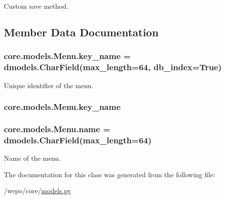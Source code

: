 Custom save method. 



\subsection{Member Data Documentation}
\hypertarget{classcore_1_1models_1_1Menu_a68d1ce76cccad9def97d24afe21ad728}{
\subsubsection[{key\-\_\-name}]{\setlength{\rightskip}{0pt plus 5cm}core.\-models.\-Menu.\-key\-\_\-name = dmodels.\-Char\-Field(max\-\_\-length=64, db\-\_\-index=True)\hspace{0.3cm}{\ttfamily [static]}}}\label{classcore_1_1models_1_1Menu_a68d1ce76cccad9def97d24afe21ad728}


Unique identifier of the menu. 

\hypertarget{classcore_1_1models_1_1Menu_a68d1ce76cccad9def97d24afe21ad728}{
\subsubsection[{key\-\_\-name}]{\setlength{\rightskip}{0pt plus 5cm}core.\-models.\-Menu.\-key\-\_\-name}}\label{classcore_1_1models_1_1Menu_a68d1ce76cccad9def97d24afe21ad728}
\hypertarget{classcore_1_1models_1_1Menu_a6782a44a3141438c0eca3fd2bcff4e9c}{
\subsubsection[{name}]{\setlength{\rightskip}{0pt plus 5cm}core.\-models.\-Menu.\-name = dmodels.\-Char\-Field(max\-\_\-length=64)\hspace{0.3cm}{\ttfamily [static]}}}\label{classcore_1_1models_1_1Menu_a6782a44a3141438c0eca3fd2bcff4e9c}


Name of the menu. 



The documentation for this class was generated from the following file\-:\begin{DoxyCompactItemize}
\item 
/wepo/core/\hyperlink{models_8py}{models.\-py}\end{DoxyCompactItemize}
